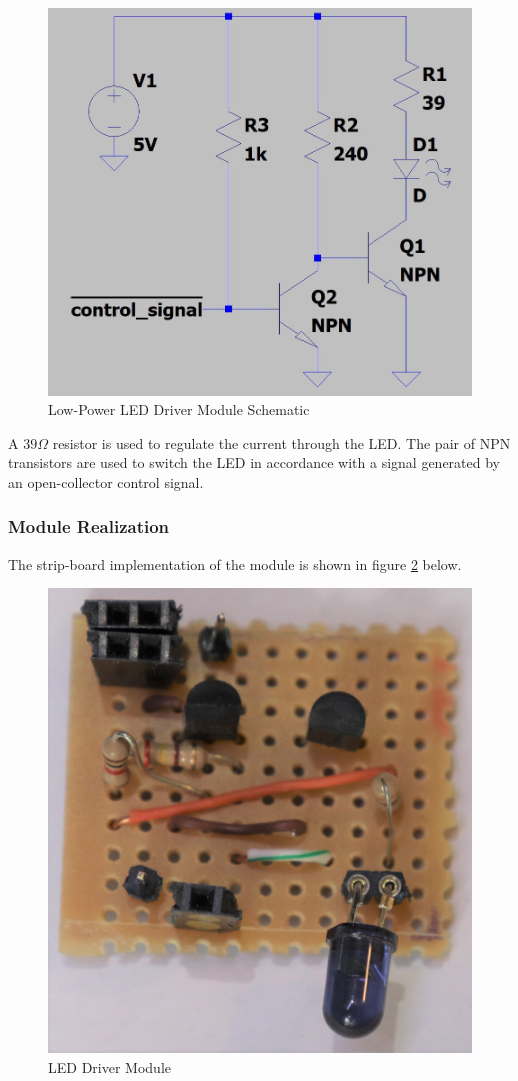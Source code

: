 \begin{figure}[H]
	\centering
	\includegraphics[width=.6\textwidth]{figures/design/low_power_led_driver.JPG}
	\caption{Low-Power LED Driver Module Schematic}
	\label{fig:schematic_low_power_led_driver}
\end{figure}

A $39\Omega$ resistor is used to regulate the current through the LED. The pair of NPN transistors are used to switch the LED in accordance with a signal generated by an open-collector control signal.

\subsubsection{Module Realization}
The strip-board implementation of the module is shown in figure \ref{fig:module_led_driver} below.

\begin{figure}[H]
	\centering
	\includegraphics[width=.6\textwidth]{figures/modules/led_driver.jpg}
	\caption{LED Driver Module}
	\label{fig:module_led_driver}
\end{figure}




